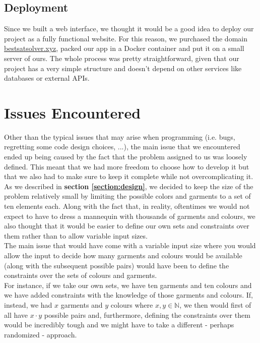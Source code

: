 \documentclass[12pt]{article}
\begin{document}
    \subsection{Deployment}
        Since we built a web interface, we thought it would be a good idea to deploy our project as a fully functional website. 
        For this reason, we purchased the domain \url{bestsatsolver.xyz}, packed our app in a Docker container and put it on a small server of ours.
        The whole process was pretty straightforward, given that our project has a very simple structure and doesn't depend on other services like databases or external APIs.

\section{Issues Encountered}
\label{section:issues}

Other than the typical issues that may arise when programming (i.e. bugs, regretting some code design choices, ...), the main issue that we encountered ended up being caused by the fact that the problem assigned to us was loosely defined. This meant that we had more freedom to choose how to develop it but that we also had to make sure to keep it complete while not overcomplicating it.\\

As we described in \textbf{section \ref{section:design}}, we decided to keep the size of the problem relatively small by limiting the possible colors and garments to a set of ten elements each. Along with the fact that, in reality, oftentimes we would not expect to have to dress a mannequin with thousands of garments and colours, we also thought that it would be easier to define our own sets and constraints over them rather than to allow variable input sizes.\\

The main issue that would have come with a variable input size where you would allow the input to decide how many garments and colours would be available (along with the subsequent possible pairs) would have been to define the constraints over the sets of colours and garments.\\

For instance, if we take our own sets, we have ten garments and ten colours and we have added constraints with the knowledge of those garments and colours.
If, instead, we had $x$ garments and $y$ colours where $x, y \in \mathbb{N}$, we then would first of all have $x \cdot y$ possible pairs and, furthermore, defining the constraints over them would be incredibly tough and we might have to take a different - perhaps randomized - approach.\\
\end{document}
